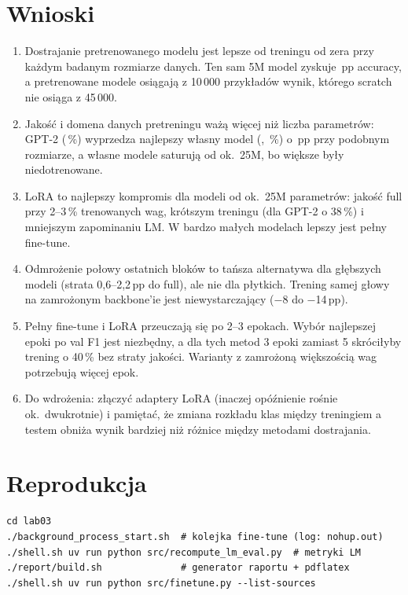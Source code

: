 \documentclass[11pt,a4paper]{article}
\begin{document}
\section{Wnioski}
\begin{enumerate}
  \item Dostrajanie pretrenowanego modelu jest lepsze od treningu od zera przy każdym badanym
        rozmiarze danych. Ten sam 5M model zyskuje \resgainPretrain\,pp accuracy, a pretrenowane
        modele osiągają z 10\,000 przykładów wynik, którego scratch nie osiąga z 45\,000.
  \item Jakość i domena danych pretreningu ważą więcej niż liczba parametrów: GPT-2 (\resbestGptAcc\,\%)
        wyprzedza najlepszy własny model (\resbestPtLabel, \resbestPtAcc\,\%) o \resgapPtGpt\,pp przy
        podobnym rozmiarze, a własne modele saturują od ok.\ 25M, bo większe były niedotrenowane.
  \item LoRA to najlepszy kompromis dla modeli od ok.\ 25M parametrów: jakość full przy 2--3\,\%
        trenowanych wag, krótszym treningu (dla GPT-2 o 38\,\%) i mniejszym zapominaniu LM.
        W bardzo małych modelach lepszy jest pełny fine-tune.
  \item Odmrożenie połowy ostatnich bloków to tańsza alternatywa dla głębszych modeli (strata
        0,6--2,2\,pp do full), ale nie dla płytkich. Trening samej głowy na zamrożonym backbone'ie jest
        niewystarczający ($-$8 do $-$14\,pp).
  \item Pełny fine-tune i LoRA przeuczają się po 2--3 epokach. Wybór najlepszej epoki po val F1 jest
        niezbędny, a dla tych metod 3 epoki zamiast 5 skróciłyby trening o 40\,\% bez straty jakości.
        Warianty z zamrożoną większością wag potrzebują więcej epok.
  \item Do wdrożenia: złączyć adaptery LoRA (inaczej opóźnienie rośnie ok.\ dwukrotnie) i pamiętać,
        że zmiana rozkładu klas między treningiem a testem obniża wynik bardziej niż różnice
        między metodami dostrajania.
\end{enumerate}

\appendix
\section{Reprodukcja}
\begin{verbatim}
cd lab03
./background_process_start.sh  # kolejka fine-tune (log: nohup.out)
./shell.sh uv run python src/recompute_lm_eval.py  # metryki LM
./report/build.sh              # generator raportu + pdflatex
./shell.sh uv run python src/finetune.py --list-sources
\end{verbatim}
\end{document}
